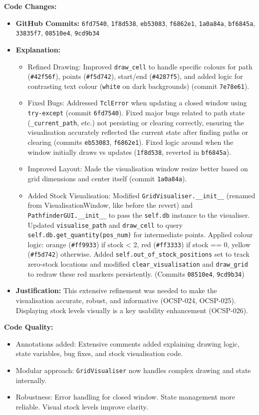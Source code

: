 \textbf{Code Changes:}
\begin{itemize}
	\item \textbf{GitHub Commits:} \verb|6fd7540|, \verb|1f8d538|, \verb|eb53083|, \verb|f6862e1|, \verb|1a0a84a|, \verb|bf6845a|, \verb|33835f7|, \verb|08510e4|, \verb|9cd9b34|
	\item \textbf{Explanation:}
	\begin{itemize}
		\item Refined Drawing: Improved \verb|draw_cell| to handle specific colours for path (\verb|#42f56f|), points (\verb|#f5d742|), start/end (\verb|#4287f5|), and added logic for contrasting text colour (\verb|white| on dark backgrounds) (commit \verb|7e78e61|).
		\item Fixed Bugs: Addressed \verb|TclError| when updating a closed window using \verb|try-except| (commit \verb|6fd7540|). Fixed major bugs related to path state (\verb|_current_path|, etc.) not persisting or clearing correctly, ensuring the visualisation accurately reflected the current state after finding paths or clearing (commits \verb|eb53083|, \verb|f6862e1|). Fixed logic around when the window initially draws vs updates (\verb|1f8d538|, reverted in \verb|bf6845a|).
		\item Improved Layout: Made the visualisation window resize better based on grid dimensions and center itself (commit \verb|1a0a84a|).
		\item Added Stock Visualisation: Modified \verb|GridVisualiser.__init__| (renamed from VisualisationWindow, like before the revert) and \verb|PathfinderGUI.__init__| to pass the \verb|self.db| instance to the visualiser. Updated \verb|visualise_path| and \verb|draw_cell| to query \verb|self.db.get_quantity(pos_num)| for intermediate points. Applied colour logic: orange (\verb|#ff9933|) if stock < 2, red (\verb|#ff3333|) if stock == 0, yellow (\verb|#f5d742|) otherwise. Added \verb|self.out_of_stock_positions| set to track zero-stock locations and modified \verb|clear_visualisation| and \verb|draw_grid| to redraw these red markers persistently. (Commits \verb|08510e4|, \verb|9cd9b34|)
	\end{itemize}
	\item \textbf{Justification:} This extensive refinement was needed to make the visualisation accurate, robust, and informative (OCSP-024, OCSP-025). Displaying stock levels visually is a key usability enhancement (OCSP-026).
\end{itemize}

\textbf{Code Quality:}
\begin{itemize}
	\item Annotations added: Extensive comments added explaining drawing logic, state variables, bug fixes, and stock visualisation code.
	\item Modular approach: \verb|GridVisualiser| now handles complex drawing and state internally.
	\item Robustness: Error handling for closed window. State management more reliable. Visual stock levels improve clarity.
\end{itemize}

